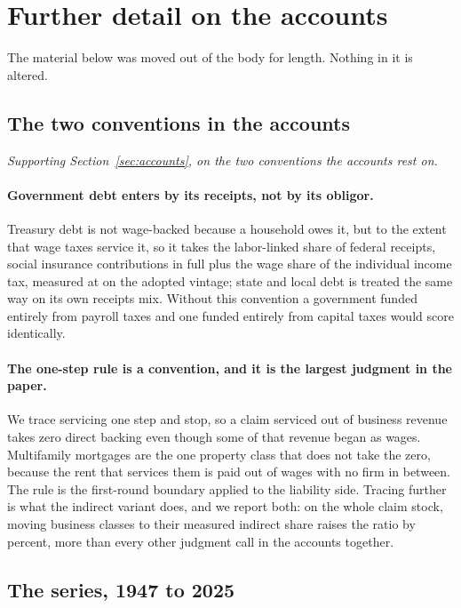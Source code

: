 \section{Further detail on the accounts}
\label{app:detail}

The material below was moved out of the body for length. Nothing in it is altered.

\subsection{The two conventions in the accounts}

\emph{Supporting Section~\ref{sec:accounts}, on the two conventions the accounts rest on.}

\paragraph{Government debt enters by its receipts, not by its obligor.} Treasury debt is not
wage-backed because a household owes it, but to the extent that wage taxes service it, so it takes
the labor-linked share of federal receipts, social insurance contributions in full plus the wage
share of the individual income tax, measured at  on the adopted vintage; state and local
debt is treated the same way on its own receipts mix. Without this convention a government funded
entirely from payroll taxes and one funded entirely from capital taxes would score identically.

\paragraph{The one-step rule is a convention, and it is the largest judgment in the paper.} We
trace servicing one step and stop, so a claim serviced out of business revenue takes zero direct
backing even though some of that revenue began as wages. Multifamily mortgages are the one
property class that does not take the zero, because the rent that services them is paid out of
wages with no firm in between. The rule is the first-round boundary applied to the liability side.
Tracing further is what the indirect variant does, and we report both: on the whole claim stock,
moving business classes to their measured indirect share raises the ratio by
 percent, more than every other judgment call in the accounts
together.

\subsection{The series, 1947 to 2025}

